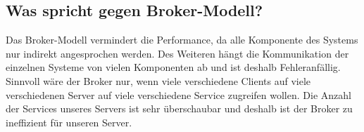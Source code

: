 \subsection*{Was spricht gegen Broker-Modell?}
Das Broker-Modell vermindert die Performance, da alle Komponente des Systems nur indirekt angesprochen werden. Des Weiteren hängt die Kommunikation der einzelnen Systeme von vielen Komponenten ab und ist deshalb Fehleranfällig.
Sinnvoll wäre der Broker nur, wenn viele verschiedene Clients auf viele verschiedenen Server auf viele verschiedene Service zugreifen wollen. Die Anzahl der Services unseres Servers ist sehr überschaubar und deshalb ist der Broker zu ineffizient für unseren Server.